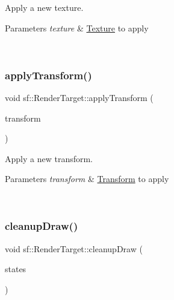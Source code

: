 Apply a new texture. 


\begin{DoxyParams}{Parameters}
{\em texture} & \mbox{\hyperlink{classsf_1_1_texture}{Texture}} to apply \begin{DoxyVerb}\end{DoxyVerb}
 \\
\hline
\end{DoxyParams}
\mbox{\label{classsf_1_1_render_target_a0b23bd7c287d0fc12b0521b649a0a0e0}} 
\subsubsection{\texorpdfstring{applyTransform()}{applyTransform()}}
{\footnotesize\ttfamily void sf\+::\+Render\+Target\+::apply\+Transform (\begin{DoxyParamCaption}\item[{const \mbox{\hyperlink{classsf_1_1_transform}{Transform}} \&}]{transform }\end{DoxyParamCaption})\hspace{0.3cm}{\ttfamily [private]}}



Apply a new transform. 


\begin{DoxyParams}{Parameters}
{\em transform} & \mbox{\hyperlink{classsf_1_1_transform}{Transform}} to apply \begin{DoxyVerb}\end{DoxyVerb}
 \\
\hline
\end{DoxyParams}
\mbox{\label{classsf_1_1_render_target_a48aa78fe0a1779fd8695a95b2a64bcea}} 
\subsubsection{\texorpdfstring{cleanupDraw()}{cleanupDraw()}}
{\footnotesize\ttfamily void sf\+::\+Render\+Target\+::cleanup\+Draw (\begin{DoxyParamCaption}\item[{const \mbox{\hyperlink{classsf_1_1_render_states}{Render\+States}} \&}]{states }\end{DoxyParamCaption})\hspace{0.3cm}{\ttfamily [private]}}



